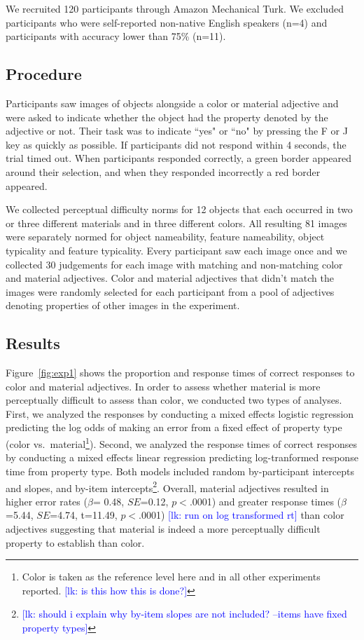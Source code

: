 \documentclass[12pt,letterpaper]{article}
\newcommand{\lk}[1]{\textcolor{Blue}{[lk: #1]}}
\begin{document}
We recruited 120 participants through Amazon Mechanical Turk. We excluded participants who were self-reported non-native English speakers (n=4) and participants with accuracy lower than 75\% (n=11).

\subsection{Procedure} 

Participants saw images of objects alongside a color or material adjective and were asked to indicate whether the object had the property denoted by the adjective or not. Their task was to indicate ``yes" or ``no" by pressing the F or J key as quickly as possible. If participants did not respond within 4 seconds, the trial timed out. When participants responded correctly, a green border appeared around their selection, and when they responded incorrectly a red border appeared.

We collected perceptual difficulty norms for 12 objects that each occurred in two or three different materials and in three different colors. All resulting 81 images were separately normed for object nameability, feature nameability, object typicality and feature typicality. Every participant saw each image once and we collected 30 judgements for each image with matching and non-matching color and material adjectives. Color and material adjectives that didn't match the images were randomly selected for each participant from a pool of adjectives denoting properties of other images in the experiment.

\subsection{Results} 

Figure~\ref{fig:exp1} shows the proportion and response times of correct responses to color and material adjectives.  In order to assess whether material is more perceptually difficult to assess than color, we conducted two types of analyses. First, we analyzed the responses by conducting a mixed effects logistic regression predicting the log odds of making an error from a fixed effect of property type (color vs.~material\footnote{Color is taken as the reference level here and in all other experiments reported. \lk{is this how this is done?}}). Second, we analyzed the response times of correct responses by conducting a mixed effects linear regression predicting log-tranformed response time from property type. Both models included random by-participant intercepts and slopes, and by-item intercepts\footnote{\lk{should i explain why by-item slopes are not included? --items have fixed property types}}. Overall, material adjectives resulted in higher error rates ($\beta$= 0.48, $SE$=0.12, $p$$<$.0001) and greater response times ($\beta$=5.44, $SE$=4.74, t=11.49, $p$$<$.0001) \lk{run on log transformed rt} than color adjectives suggesting that material is indeed a more perceptually difficult property to establish than color. 
\end{document}
